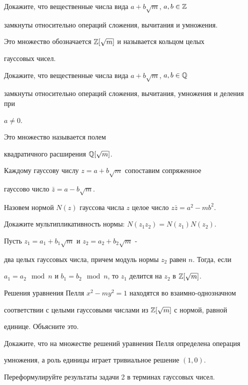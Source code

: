\documentclass[a4paper,12pt]{article}
\let\ZZ=\Z
\let\QQ=\Q
\begin{document}

 Докажите, что вещественные числа вида $a+b\sqrt{m}$, $a,b\in\ZZ$

замкнуты относительно операций сложения, вычитания и умножения.

Это множество обозначается $\ZZ[\sqrt{m}]$ и называется кольцом целых

гауссовых чисел.



 Докажите, что вещественные числа вида $a+b\sqrt{m}$, $a,b\in\QQ$

замкнуты относительно операций сложения, вычитания, умножения и деления при

$a\not=0$.

Это множество  называется полем

квадратичного расширения $\QQ[\sqrt{m}]$.



 Каждому гауссову числу $z=a+b\sqrt{m}$ сопоставим сопряженное

гауссово число $\bar{z}=a-b\sqrt{m}$.

Назовем нормой $N(z)$ гауссова числа $z$ целое число $z\bar{z}=a^2-mb^2$.

 Докажите мультипликативность нормы: $N(z_1z_2)=N(z_1)N(z_2).$



 Пусть $z_1=a_1+b_1\sqrt{m}$ и $z_2=a_2+b_2\sqrt{m}$ -

два целых гауссовых числа, причем модуль нормы $z_2$ равен $n$. Тогда, если

$a_1=a_2 \mod n$ и $b_1=b_2 \mod n$, то $z_1$ делится на $z_2$ в $\ZZ[\sqrt{m}]$.





 Решения уравнения Пелля $x^2-my^2=1$ находятся во взаимно-однозначном

соответствии с целыми гауссовыми числами из $\ZZ[\sqrt{m}]$ с нормой, равной

единице. Объясните это.



 Докажите, что на множестве решений уравнения Пелля определена операция

умножения, а роль единицы играет тривиальное решение $(1,0)$.



 Переформулируйте результаты задачи 2 в терминах гауссовых чисел.
\end{document}
